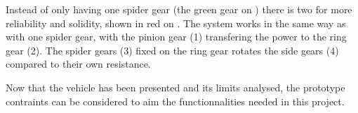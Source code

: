 








Instead of only having one spider gear (the green gear on ) there is two for more reliability and solidity, shown in red on . The system works in the same way as with one spider gear, with the pinion gear (1) transfering the power to the ring gear (2). The spider gears (3) fixed on the ring gear rotates the side gears (4) compared to their own resistance.

Now that the vehicle has been presented and its limits analysed, the prototype contraints can be considered to aim the functionnalities needed in this project.

